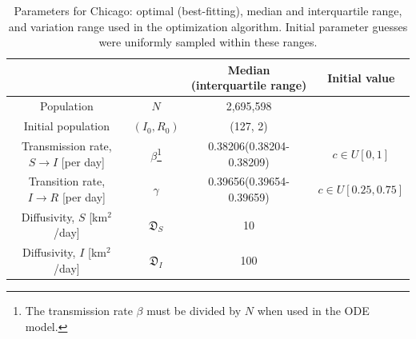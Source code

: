 \documentclass[11pt]{article}
\newcommand{\D}{\mathfrak{D}}
\begin{document}
	\begin{table}[h]
		\centering
		\caption{Parameters for Chicago: optimal (best-fitting), median and interquartile range, and variation range used in the optimization algorithm. Initial parameter guesses were uniformly sampled within these ranges.}
		\label{tab:parameters}
		\begin{tabular}{ c c c c }
			\hline
			\hline
			&	&	Median (interquartile range)	&	Initial value \\
			\hline
			Population	&	$N$	&	2,695,598	& \\
			Initial population	&	$(I_0, R_0)$	&	(127, 2)	& \\
			Transmission rate, $S \rightarrow I$ [per day]	&	$\beta$\footnote{The transmission rate $\beta$ must be divided by $N$ when used in the ODE model.}	&	0.38206(0.38204-0.38209)	&	$c \in U[0,1]$ \\
			Transition rate, $I \rightarrow R$ [per day]	&	$\gamma$	&	 0.39656(0.39654-0.39659)	&	$c \in U[0.25,0.75]$ \\
			Diffusivity, $S$ [km$^2$/day]	&	$\D_S$	&	10	&	\\
			Diffusivity, $I$ [km$^2$/day]	&	$\D_I$	&	100	&	\\
			\hline
			\hline
		\end{tabular}
	\end{table}
\end{document}
